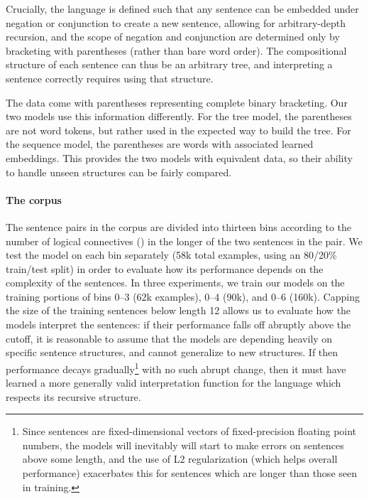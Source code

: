 Crucially, the language is defined such that any sentence can be embedded under negation or conjunction to create a new sentence, allowing for arbitrary-depth recursion, and the scope of negation and conjunction are determined only by bracketing with parentheses (rather than bare word order). The compositional structure of each sentence can thus be an arbitrary tree, and interpreting a sentence correctly requires using that structure.

The data come with parentheses representing complete binary bracketing. Our two models use this information differently. For the tree model, the parentheses are not word tokens, but rather used in the expected way to build the tree. For the sequence model, the parentheses are words with associated learned embeddings. This provides the two models with equivalent data, so their ability to handle unseen structures can be fairly compared.

\paragraph{The corpus}
The sentence pairs in the corpus are divided into thirteen bins according to the number of logical connectives () in the longer of the two sentences in the pair. We test the model on each bin separately (58k total examples, using an 80/20\% train/test split) in order to evaluate how its performance depends on the complexity of the sentences. In three experiments, we train our models on the training portions of bins 0--3 (62k examples), 0--4 (90k), and 0--6 (160k). Capping the size of the training sentences below length 12 allows us to evaluate how the models interpret the sentences: if their performance falls off abruptly above the cutoff, it is reasonable to assume that the models are depending heavily on specific sentence structures, and cannot generalize to new structures. If then performance decays gradually\footnote{Since sentences are fixed-dimensional vectors of fixed-precision floating point numbers, the models will inevitably will start to make errors on sentences above some length, and the use of L2 regularization (which helps overall performance) exacerbates this for sentences which are longer than those seen in training.} with no such abrupt change, then it must have learned a more generally valid interpretation function for the language which respects its recursive structure.



